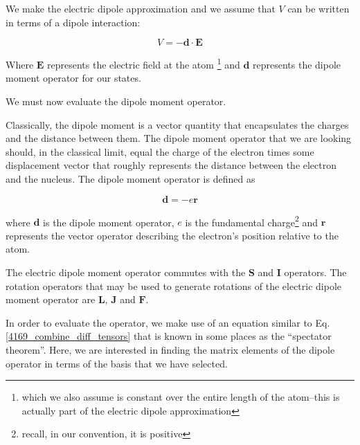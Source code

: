 
We make the electric dipole approximation and we assume that $V$ can be written in terms of a dipole interaction:  \cite{demilleBudkerKimball}\cite{cuaMITnotes}\cite{gustavsonThesis}\cite{Young1997363}

\begin{equation}
V=-\mathbf{d}\cdot\mathbf{E}
\end{equation}

Where $\mathbf{E}$ represents the electric field at the atom \footnote{which we also assume is constant over the entire length of the atom--this is actually part of the electric dipole approximation} and $\mathbf{d}$ represents the dipole moment operator for our states. 

We must now evaluate the dipole moment operator. 


Classically, the dipole moment is a vector quantity that encapsulates the charges and the distance between them. The dipole moment operator that we are looking should, in the classical limit, equal the charge of the electron times some displacement vector that roughly represents the distance between the electron and the nucleus. The dipole moment operator is defined as 

\begin{equation}
\mathbf{d}=-e\mathbf{r}
\end{equation}

where $\mathbf{d}$ is the dipole moment operator, $e$ is the fundamental charge\footnote{recall, in our convention, it is positive} and $\mathbf{r}$ represents the vector operator describing the electron's position relative to the atom\cite{demilleBudkerKimball}.

The electric dipole moment operator commutes with the $\mathbf{S}$ and $\mathbf{I}$ operators. The rotation operators that may be used to generate rotations of the electric dipole moment operator are $\mathbf{L}$, $\mathbf{J}$ and $\mathbf{F}$.\cite{DeMille_presentation}

In order to evaluate the operator, we make use of an equation similar to Eq.\,\ref{4169_combine_diff_tensors} that is known in some places as the ``spectator theorem''\cite{DeMille_presentation}. Here, we are interested in finding the matrix elements of the dipole operator in terms of the  basis that we have selected.

